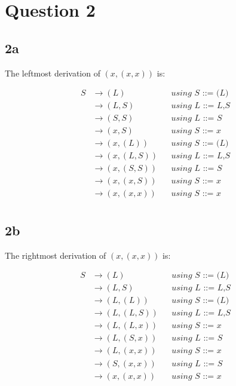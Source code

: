 \documentclass{article}
\begin{document}
    \section*{Question 2}

    \subsection*{2a}
    The leftmost derivation of $(x,(x,x))$ is:

    \begin{align*}
        S   & \rightarrow (L)       && \textit{using S ::= (L)} \\
            & \rightarrow (L,S)     && \textit{using L ::= L,S} \\
            & \rightarrow (S,S)     && \textit{using L ::= S} \\
            & \rightarrow (x,S)     && \textit{using S ::= x} \\
            & \rightarrow (x,(L))   && \textit{using S ::= (L)} \\
            & \rightarrow (x,(L,S)) && \textit{using L ::= L,S} \\
            & \rightarrow (x,(S,S)) && \textit{using L ::= S} \\
            & \rightarrow (x,(x,S)) && \textit{using S ::= x} \\
            & \rightarrow (x,(x,x)) && \textit{using S ::= x} \\
    \end{align*}

    \subsection*{2b}
    The rightmost derivation of $(x,(x,x))$ is:
    
    \begin{align*}
        S   & \rightarrow (L)       && \textit{using S ::= (L)} \\
            & \rightarrow (L,S)     && \textit{using L ::= L,S} \\
            & \rightarrow (L,(L))   && \textit{using S ::= (L)} \\
            & \rightarrow (L,(L,S)) && \textit{using L ::= L,S} \\
            & \rightarrow (L,(L,x)) && \textit{using S ::= x} \\
            & \rightarrow (L,(S,x)) && \textit{using L ::= S} \\
            & \rightarrow (L,(x,x)) && \textit{using S ::= x} \\
            & \rightarrow (S,(x,x)) && \textit{using L ::= S} \\
            & \rightarrow (x,(x,x)) && \textit{using S ::= x} \\
    \end{align*}
\end{document}
